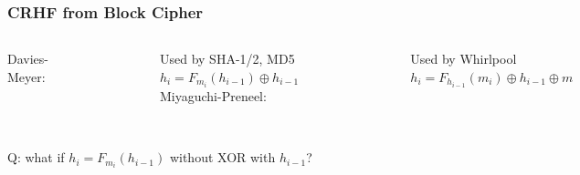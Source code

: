 \begin{frame}\frametitle{CRHF from Block Cipher}
\begin{columns}
Davies-Meyer:
\begin{figure}
\begin{center}

\end{center}
\end{figure}
Used by SHA-1/2, MD5\\
$h_{i} = F_{m_{i}}(h_{i-1}) \oplus h_{i-1}$
Miyaguchi-Preneel:
\begin{figure}
\begin{center}

\end{center}
\end{figure}
Used by Whirlpool\\
$h_{i} = F_{h_{i-1}}(m_{i}) \oplus h_{i-1} \oplus m$
\end{columns}
$\quad$\\
\alert{Q: what if $h_{i} = F_{m_{i}}(h_{i-1})$ without XOR with $h_{i-1}$? }
\end{frame}
